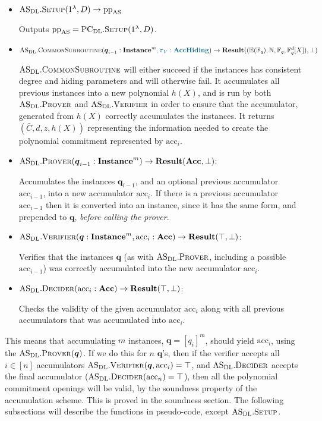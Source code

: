 \documentclass[
]{article}
\newcommand*\Fb{\mathbb{F}}
\newcommand*\Nb{\mathbb{N}}
\newcommand*\Eb{\mathbb{E}}
\renewcommand*\l{\lambda}
\newcommand{\mathblue}[1]{\mathcolor{GbBlueDk}{#1}}
\renewcommand{\vec}[1]{ \boldsymbol{#1} }
\newcommand*{\pp}{\mathrm{pp}}
\newcommand*{\acc}{\mathrm{acc}}
\newcommand*{\Setup}{\mathrm{\text{S{\scriptsize ETUP}}}}
\newcommand*{\AS}{\text{AS}}
\newcommand*{\PCDL}{\text{PC}_{\text{DL}}}
\newcommand*{\PCDLSetup}{\PCDL.\Setup}
\newcommand*{\ASDL}{\text{AS}_{\text{DL}}}
\newcommand*{\ASDLSetup}{\ASDL.\Setup}
\newcommand*{\ASDLCommonSubroutine}{\ASDL.\mathrm{\text{C{\scriptsize OMMON}S{\scriptsize UBROUTINE}}}}
\newcommand*{\ASDLProver}{\ASDL.\mathrm{\text{P\scriptsize ROVER}}}
\newcommand*{\ASDLVerifier}{\ASDL.\mathrm{\text{V\scriptsize ERIFIER}}}
\newcommand*{\ASDLDecider}{\ASDL.\mathrm{\text{D\scriptsize ECIDER}}}
\newcommand*\Result{\mathbf{Result}}
\newcommand*\Acc{\mathbf{Acc}}
\newcommand*\Instance{\mathbf{Instance}}
\newcommand*\AccHiding{\mathbf{AccHiding}}
\begin{document}
\begin{itemize}
\item
  \(\ASDLSetup(1^\l, D) \to \pp_\AS\)

  Outputs \(\pp_\AS = \PCDLSetup(1^\l, D)\).
\item
  \(\ASDLCommonSubroutine(\vec{q}_{i-1}: \Instance^m \mathblue{, \pi_V: \AccHiding}) \to \Result((\Eb(\Fb_q), \Nb, \Fb_q, \Fb^d_q[X]), \bot)\)

  \(\ASDLCommonSubroutine\) will either succeed if the instances has
  consistent degree and hiding parameters and will otherwise fail. It
  accumulates all previous instances into a new polynomial \(h(X)\), and
  is run by both \(\ASDLProver\) and \(\ASDLVerifier\) in order to
  ensure that the accumulator, generated from \(h(X)\) correctly
  accumulates the instances. It returns \((\bar{C}, d, z, h(X))\)
  representing the information needed to create the polynomial
  commitment represented by \(\acc_i\).
\item
  \(\ASDLProver(\vec{q}_{i-1}: \Instance^m) \to \Result(\Acc, \bot)\):

  Accumulates the instances \(\vec{q}_{i-1}\), and an optional previous
  accumulator \(\acc_{i-1}\), into a new accumulator \(\acc_i\). If
  there is a previous accumulator \(\acc_{i-1}\) then it is converted
  into an instance, since it has the same form, and prepended to
  \(\vec{q}\), \emph{before calling the prover}.
\item
  \(\ASDLVerifier(\vec{q}: \Instance^m, \acc_i: \Acc) \to \Result(\top, \bot)\):

  Verifies that the instances \(\vec{q}\) (as with \(\ASDLProver\),
  including a possible \(\acc_{i-1}\)) was correctly accumulated into
  the new accumulator \(\acc_i\).
\item
  \(\ASDLDecider(\acc_i: \Acc) \to \Result(\top, \bot)\):

  Checks the validity of the given accumulator \(\acc_i\) along with all
  previous accumulators that was accumulated into \(\acc_i\).
\end{itemize}

This means that accumulating \(m\) instances, \(\vec{q} = [q_i]^m\),
should yield \(\acc_i\), using the \(\ASDLProver(\vec{q})\). If we do
this for \(n\) \(\vec{q}\)'s, then if the verifier accepts all
\(i \in [n]\) accumulators \(\ASDLVerifier(\vec{q}, \acc_i) = \top\),
and \(\ASDLDecider\) accepts the final accumulator
(\(\ASDLDecider(\acc_n) = \top\)), then all the polynomial commitment
openings will be valid, by the soundness property of the accumulation
scheme. This is proved in the soundness section. The following
subsections will describe the functions in pseudo-code, except
\(\ASDLSetup\).
\end{document}
